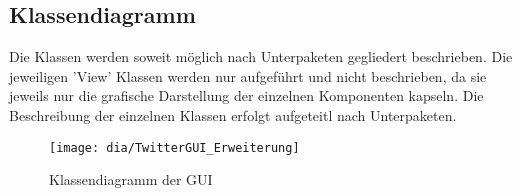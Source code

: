 \subsection{Klassendiagramm}
Die Klassen werden soweit möglich nach Unterpaketen gegliedert beschrieben. Die jeweiligen 'View' Klassen werden nur aufgeführt und nicht beschrieben, da sie jeweils nur die grafische Darstellung der einzelnen Komponenten kapseln. Die Beschreibung der einzelnen Klassen erfolgt aufgeteitl nach Unterpaketen.

\begin{figure}[h!]
	\centering
	\texttt{[image: dia/TwitterGUI\_Erweiterung]}
	\caption{Klassendiagramm der GUI}
	\label{fig:GUI}
\end{figure}
\quad

